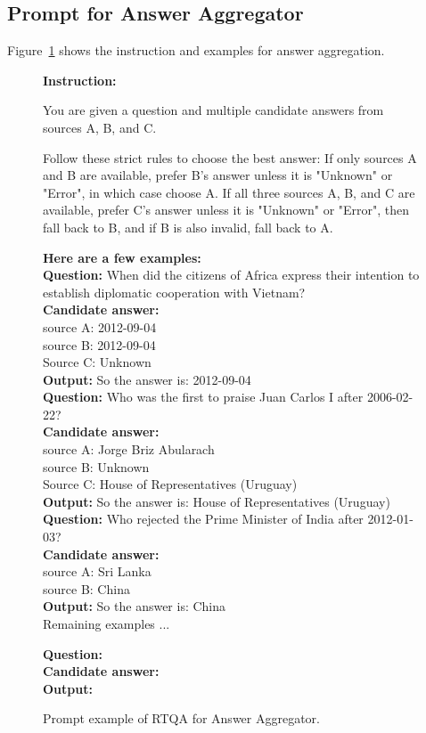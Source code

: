 \documentclass[11pt]{article}
\begin{document}
\subsection{Prompt for Answer Aggregator}
\label{A:prompts for answer aggre}
Figure~\ref{fig:prompt answer aggre} shows the instruction and examples for answer aggregation.
%
\begin{figure}[!h]
\begin{tcolorbox}[
    colback=black!10, 
    colframe=black!70, 
    boxrule=1pt, 
    arc=5mm, 
    boxsep=2mm, 
    left=5mm, 
    right=5mm, 
    top=5mm, 
    bottom=4mm,
    width=\textwidth, %
    nobeforeafter, %
    colupper=black %
]
{\small\sffamily %
\textbf{Instruction:} 

 You are given a question and multiple candidate answers from sources A, B, and C.
 
 Follow these strict rules to choose the best answer: If only sources A and B are available, prefer B's answer unless it is "Unknown" or "Error", in which case choose A. If all three sources A, B, and C are available, prefer C's answer unless it is "Unknown" or "Error", then fall back to B, and if B is also invalid, fall back to A. 
 

\vspace{0.5em}
\textbf{Here are a few examples:}\\[1em]
\textbf{Question:} When did the citizens of Africa express their intention to establish diplomatic cooperation with Vietnam?\\
\textbf{Candidate answer:}\\
source A: 2012-09-04\\
source B: 2012-09-04\\
Source C: Unknown\\
\textbf{Output:} So the answer is: 2012-09-04\\[0.5em]
\textbf{Question:} Who was the first to praise Juan Carlos I after 2006-02-22?\\
\textbf{Candidate answer:}\\
source A: Jorge Briz Abularach\\
source B: Unknown\\
Source C: House of Representatives (Uruguay)\\
\textbf{Output:} So the answer is: House of Representatives (Uruguay)\\[0.5em]
\textbf{Question:} Who rejected the Prime Minister of India after 2012-01-03?\\
\textbf{Candidate answer:}\\
source A: Sri Lanka\\
source B: China\\
\textbf{Output:} So the answer is: China\\[0.5em]
Remaining examples ...
\vspace{0.5em}

\textbf{Question:} \\
\textbf{Candidate answer:}\\
\textbf{Output:}
} %
\end{tcolorbox}
\caption{Prompt example of RTQA for Answer Aggregator.}
\label{fig:prompt answer aggre}
\end{figure}
\end{document}
